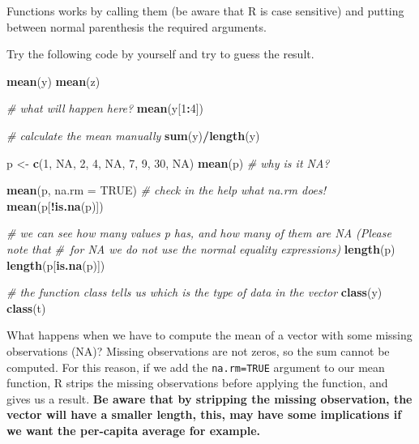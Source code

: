 \documentclass[
]{svmono}
\newenvironment{Shaded}{\begin{snugshade}}{\end{snugshade}}
\newcommand{\AttributeTok}[1]{\textcolor[rgb]{0.13,0.29,0.53}{#1}}
\newcommand{\CommentTok}[1]{\textcolor[rgb]{0.56,0.35,0.01}{\textit{#1}}}
\newcommand{\ConstantTok}[1]{\textcolor[rgb]{0.56,0.35,0.01}{#1}}
\newcommand{\DecValTok}[1]{\textcolor[rgb]{0.00,0.00,0.81}{#1}}
\newcommand{\FunctionTok}[1]{\textcolor[rgb]{0.13,0.29,0.53}{\textbf{#1}}}
\newcommand{\NormalTok}[1]{#1}
\newcommand{\OtherTok}[1]{\textcolor[rgb]{0.56,0.35,0.01}{#1}}
\newcommand{\SpecialCharTok}[1]{\textcolor[rgb]{0.81,0.36,0.00}{\textbf{#1}}}
\begin{document}
Functions works by calling them (be aware that R is case sensitive) and
putting between normal parenthesis the required arguments.

Try the following code by yourself and try to guess the result.

\begin{Shaded}
\begin{Highlighting}[]
\FunctionTok{mean}\NormalTok{(y)}
\FunctionTok{mean}\NormalTok{(z)}

\CommentTok{\# what will happen here?}
\FunctionTok{mean}\NormalTok{(y[}\DecValTok{1}\SpecialCharTok{:}\DecValTok{4}\NormalTok{])}

\CommentTok{\# calculate the mean manually}
\FunctionTok{sum}\NormalTok{(y)}\SpecialCharTok{/}\FunctionTok{length}\NormalTok{(y)}

\NormalTok{p }\OtherTok{\textless{}{-}} \FunctionTok{c}\NormalTok{(}\DecValTok{1}\NormalTok{, }\ConstantTok{NA}\NormalTok{, }\DecValTok{2}\NormalTok{, }\DecValTok{4}\NormalTok{, }\ConstantTok{NA}\NormalTok{, }\DecValTok{7}\NormalTok{, }\DecValTok{9}\NormalTok{, }\DecValTok{30}\NormalTok{, }\ConstantTok{NA}\NormalTok{)}
\FunctionTok{mean}\NormalTok{(p)}
\CommentTok{\# why is it NA?}

\FunctionTok{mean}\NormalTok{(p, }\AttributeTok{na.rm =} \ConstantTok{TRUE}\NormalTok{)}
\CommentTok{\# check in the help what na.rm does!}
\FunctionTok{mean}\NormalTok{(p[}\SpecialCharTok{!}\FunctionTok{is.na}\NormalTok{(p)])}

\CommentTok{\# we can see how many values p has, and how many of them are NA (Please note that }
\CommentTok{\# for NA we do not use the normal equality expressions)}
\FunctionTok{length}\NormalTok{(p)}
\FunctionTok{length}\NormalTok{(p[}\FunctionTok{is.na}\NormalTok{(p)])}

\CommentTok{\# the function class tells us which is the type of data in the vector}
\FunctionTok{class}\NormalTok{(y)}
\FunctionTok{class}\NormalTok{(t)}
\end{Highlighting}
\end{Shaded}

What happens when we have to compute the mean of a vector with some
missing observations (NA)? Missing observations are not zeros, so the
sum cannot be computed. For this reason, if we add the \texttt{na.rm=TRUE}
argument to our mean function, R strips the missing observations before
applying the function, and gives us a result. \textbf{Be aware that by
stripping the missing observation, the vector will have a smaller
length, this, may have some implications if we want the per-capita
average for example.}
\end{document}

